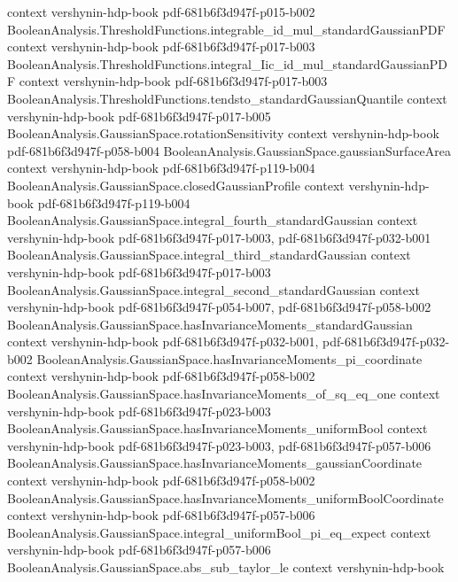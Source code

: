 \begin{theorem}
  {context}
  {vershynin-hdp-book}
  {pdf-681b6f3d947f-p015-b002}
\proofstep
  {BooleanAnalysis.ThresholdFunctions.integrable_id_mul_standardGaussianPDF}
  {context}
  {vershynin-hdp-book}
  {pdf-681b6f3d947f-p017-b003}
\proofstep
  {BooleanAnalysis.ThresholdFunctions.integral_Iic_id_mul_standardGaussianPDF}
  {context}
  {vershynin-hdp-book}
  {pdf-681b6f3d947f-p017-b003}
\proofstep
  {BooleanAnalysis.ThresholdFunctions.tendsto_standardGaussianQuantile}
  {context}
  {vershynin-hdp-book}
  {pdf-681b6f3d947f-p017-b005}
\proofstep
  {BooleanAnalysis.GaussianSpace.rotationSensitivity}
  {context}
  {vershynin-hdp-book}
  {pdf-681b6f3d947f-p058-b004}
\proofstep
  {BooleanAnalysis.GaussianSpace.gaussianSurfaceArea}
  {context}
  {vershynin-hdp-book}
  {pdf-681b6f3d947f-p119-b004}
\proofstep
  {BooleanAnalysis.GaussianSpace.closedGaussianProfile}
  {context}
  {vershynin-hdp-book}
  {pdf-681b6f3d947f-p119-b004}
\proofstep
  {BooleanAnalysis.GaussianSpace.integral_fourth_standardGaussian}
  {context}
  {vershynin-hdp-book}
  {pdf-681b6f3d947f-p017-b003,
    pdf-681b6f3d947f-p032-b001}
\proofstep
  {BooleanAnalysis.GaussianSpace.integral_third_standardGaussian}
  {context}
  {vershynin-hdp-book}
  {pdf-681b6f3d947f-p017-b003}
\proofstep
  {BooleanAnalysis.GaussianSpace.integral_second_standardGaussian}
  {context}
  {vershynin-hdp-book}
  {pdf-681b6f3d947f-p054-b007,
    pdf-681b6f3d947f-p058-b002}
\proofstep
  {BooleanAnalysis.GaussianSpace.hasInvarianceMoments_standardGaussian}
  {context}
  {vershynin-hdp-book}
  {pdf-681b6f3d947f-p032-b001,
    pdf-681b6f3d947f-p032-b002}
\proofstep
  {BooleanAnalysis.GaussianSpace.hasInvarianceMoments_pi_coordinate}
  {context}
  {vershynin-hdp-book}
  {pdf-681b6f3d947f-p058-b002}
\proofstep
  {BooleanAnalysis.GaussianSpace.hasInvarianceMoments_of_sq_eq_one}
  {context}
  {vershynin-hdp-book}
  {pdf-681b6f3d947f-p023-b003}
\proofstep
  {BooleanAnalysis.GaussianSpace.hasInvarianceMoments_uniformBool}
  {context}
  {vershynin-hdp-book}
  {pdf-681b6f3d947f-p023-b003,
    pdf-681b6f3d947f-p057-b006}
\proofstep
  {BooleanAnalysis.GaussianSpace.hasInvarianceMoments_gaussianCoordinate}
  {context}
  {vershynin-hdp-book}
  {pdf-681b6f3d947f-p058-b002}
\proofstep
  {BooleanAnalysis.GaussianSpace.hasInvarianceMoments_uniformBoolCoordinate}
  {context}
  {vershynin-hdp-book}
  {pdf-681b6f3d947f-p057-b006}
\proofstep
  {BooleanAnalysis.GaussianSpace.integral_uniformBool_pi_eq_expect}
  {context}
  {vershynin-hdp-book}
  {pdf-681b6f3d947f-p057-b006}
\proofstep
  {BooleanAnalysis.GaussianSpace.abs_sub_taylor_le}
  {context}
  {vershynin-hdp-book}

\end{theorem}
